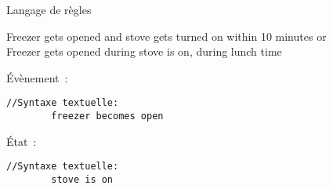 \begin{frame}[fragile]{Langage de règles}
\addtocounter{framenumber}{-1}
  \begin{coloredbox}[gray]{}
    \begin{footnotesize}
      Freezer \colorbox{checked!50}{gets opened} \colorbox{black!2}{and} stove gets turned on \colorbox{black!2}{within 10 minutes} or\\ Freezer gets opened during stove \colorbox{darkgray!50}{is on}, during lunch time
    \end{footnotesize}
  \end{coloredbox}
\vfill
  \begin{minipage}{.31\linewidth}
    \begin{coloredbox}[checked]{Évènement~:}
      \begin{lstlisting}[language=MaloyaText]
        //Syntaxe textuelle:
        freezer becomes open
      \end{lstlisting}
    \end{coloredbox}
  \end{minipage}
  \hfill
  \begin{minipage}{.31\linewidth}
    \begin{coloredbox}[darkgray]{État~:}
      \begin{lstlisting}[language=MaloyaText]
        //Syntaxe textuelle:
        stove is on
      \end{lstlisting}
    \end{coloredbox}
  \end{minipage}
  \hfill
  \begin{minipage}{.33\linewidth}
  \begin{center}
    \begin{scriptsize}
\end{scriptsize}
\end{center}
\end{minipage}
\end{frame}
